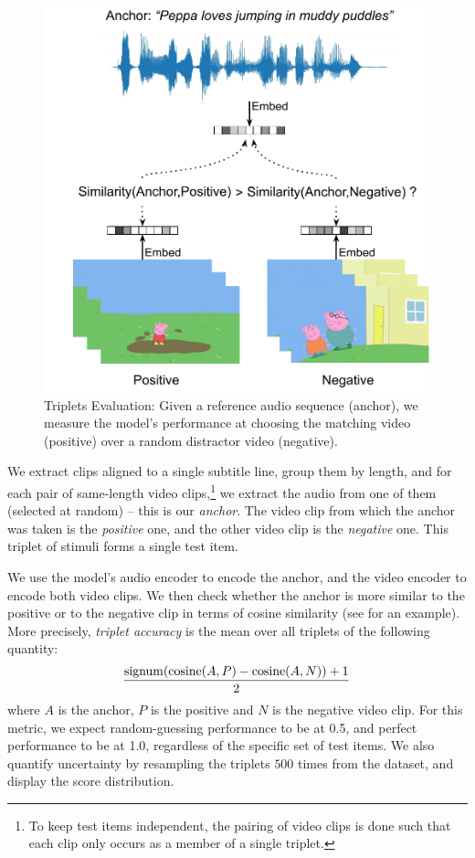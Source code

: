 \begin{figure}
	\centering
	\includegraphics[width=\columnwidth]{peppa_triplets_eval_detailed.pdf}
	\caption{Triplets Evaluation: Given a reference audio sequence (anchor), we 
	measure the model's performance at choosing the matching video (positive) 
	over a random distractor video (negative).}
	\label{fig:triplets_eval}
\end{figure}

We extract clips aligned to a single subtitle
line, group them by length, and for each pair of same-length video
clips,\footnote{To keep test items independent, the pairing of video
  clips is done such that each clip only occurs as a member of a single
  triplet.} we extract the audio from one of them (selected at
random) -- this is our {\it anchor}. The video clip from which the
anchor was taken is the {\it positive} one, and the other video clip
is the {\it negative} one. This triplet of stimuli forms a single test
item.

We use the model's audio encoder to encode the anchor, and the
video encoder to encode both video clips. We then check whether 
the anchor is more similar to the positive or to the negative clip in terms of cosine
similarity (see  for an example).  More precisely, {\it triplet 
accuracy} is the mean over all triplets of the following quantity:
\begin{equation}
\hspace{-.03cm}
  \frac{\mathrm{signum}(\mathrm{cosine}(A, P) - \mathrm{cosine}(A, N)) + 1}{2}
  \label{eq:triplet-acc}
\end{equation}
where $A$ is the anchor, $P$ is the positive and $N$ is the negative video 
clip. 
For this metric, we expect random-guessing performance to be at 0.5, and perfect
performance to be at 1.0, regardless of the specific set of test items. We also 
quantify uncertainty by resampling the triplets $500$ times from the dataset, 
and display the score distribution.

